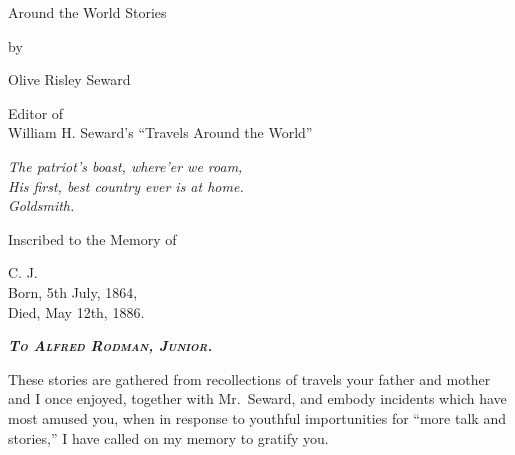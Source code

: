 \documentclass[12pt]{book}
\begin{document}
\frontmatter


\begin{titlepage}
\vspace*{\fill}

\center

\LARGE
\sc

Around the World Stories

\vspace{5em}

\large

by
\vspace{1em}

\Large
Olive Risley Seward

\rm \large
\vspace{0.5em}

Editor of\\
William H. Seward’s “Travels Around the World”

\vspace{5em}

\it
The patriot’s boast, where’er we roam,\\
His first, best country ever is at home.\\
\hspace{14em} \rm Goldsmith.

\vspace*{\fill}
\end{titlepage}


\sc
\vspace*{\fill}

\begin{center}
\large
Inscribed to the Memory of
\vspace{0.5em}

\LARGE C. J. \large \\
Born, 5th July, 1864, \\
Died, May 12th, 1886.
\end{center}

\vspace*{\fill}
\rm

\newpage

\begin{center}
{\Large \textbf{\textit{\textsc{To Alfred Rodman, Junior.}}}}
\end{center}

\vspace{0.5em}


These stories are gathered from recollections of travels your father and mother
and I once enjoyed, together with Mr.~Seward, and embody incidents which have
most amused you, when in response to youthful importunities for “more talk and
stories,” I have called on my memory to gratify you.
\end{document}
